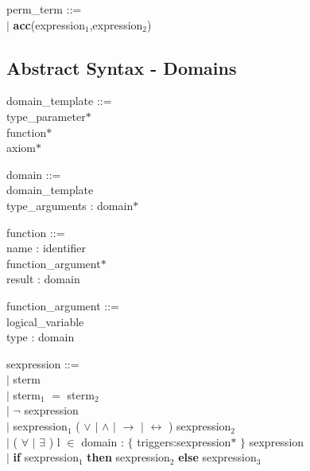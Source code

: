 \documentclass{paper}
\begin{document}
	\begin{tabbing}
 			perm\_term ::= \\
 			\indent $|$ \textbf{acc}(expression$_1$,expression$_2$) \\
	\end{tabbing}
	
	\subsection{Abstract Syntax - Domains}
		
	\begin{tabbing}
 			domain\_template ::= \\
 			\indent type\_parameter$\ast$ \\
 			\indent function$\ast$ \\
 			\indent axiom$\ast$ \\
	\end{tabbing}
	
	\begin{tabbing}
 			domain ::= \\
 			\indent domain\_template \\
 			\indent type\_arguments : domain$\ast$ \\
 	\end{tabbing}			

	\begin{tabbing}
 			function ::= \\
 			\indent name   : identifier \\
 			\indent function\_argument$\ast$ \\
 			\indent result : domain \\
	\end{tabbing}
	
	\begin{tabbing}
 			function\_argument ::= \\
 			\indent logical\_variable \\
 			\indent type : domain \\
	\end{tabbing}

	\begin{tabbing}
 			sexpression ::= \\
 			\indent $|$ sterm \\
 			\indent $|$ sterm$_1$ $=$ sterm$_2$ \\
 			\indent $|$ $\lnot$ sexpression \\
 			\indent $|$ sexpression$_1$ ( $\lor$ $|$ $\land$ $|$ $\rightarrow$ $|$ $\leftrightarrow$ ) sexpression$_2$ \\
 			\indent $|$ ( $\forall$ $|$ $\exists$ ) l $\in$ domain : $\{$ triggers:sexpression$\ast$ $\}$ sexpression  \\
 			\indent $|$ \textbf{if} sexpression$_1$ \textbf{then} sexpression$_2$ \textbf{else} sexpression$_3$\\
	\end{tabbing}
\end{document}
